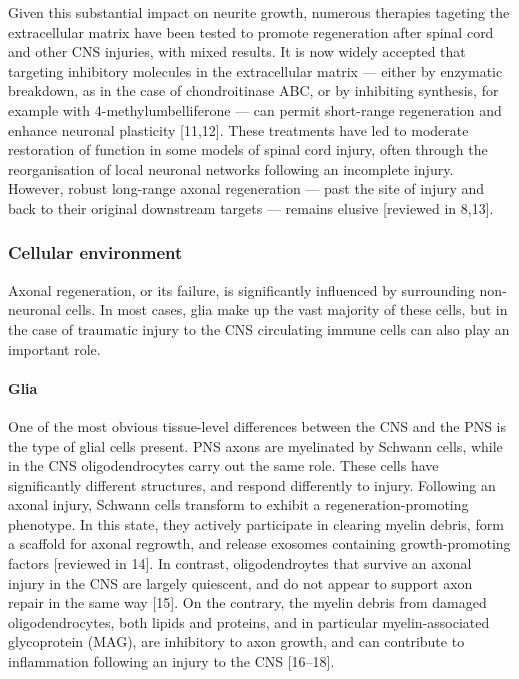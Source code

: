 \documentclass[
  12pt,
  a4paper,
]{book}
\begin{document}
Given this substantial impact on neurite growth, numerous therapies tageting the extracellular matrix have been tested to promote regeneration after spinal cord and other CNS injuries, with mixed results. It is now widely accepted that targeting inhibitory molecules in the extracellular matrix --- either by enzymatic breakdown, as in the case of chondroitinase ABC, or by inhibiting synthesis, for example with 4-methylumbelliferone --- can permit short-range regeneration and enhance neuronal plasticity {[}11,12{]}. These treatments have led to moderate restoration of function in some models of spinal cord injury, often through the reorganisation of local neuronal networks following an incomplete injury. However, robust long-range axonal regeneration --- past the site of injury and back to their original downstream targets --- remains elusive {[}reviewed in 8,13{]}.

\hypertarget{cellular-environment}{%
\subsubsection{Cellular environment}\label{cellular-environment}}

Axonal regeneration, or its failure, is significantly influenced by surrounding non-neuronal cells. In most cases, glia make up the vast majority of these cells, but in the case of traumatic injury to the CNS circulating immune cells can also play an important role.

\hypertarget{glia}{%
\paragraph{Glia}\label{glia}}

One of the most obvious tissue-level differences between the CNS and the PNS is the type of glial cells present. PNS axons are myelinated by Schwann cells, while in the CNS oligodendrocytes carry out the same role. These cells have significantly different structures, and respond differently to injury. Following an axonal injury, Schwann cells transform to exhibit a regeneration-promoting phenotype. In this state, they actively participate in clearing myelin debris, form a scaffold for axonal regrowth, and release exosomes containing growth-promoting factors {[}reviewed in 14{]}. In contrast, oligodendroytes that survive an axonal injury in the CNS are largely quiescent, and do not appear to support axon repair in the same way {[}15{]}. On the contrary, the myelin debris from damaged oligodendrocytes, both lipids and proteins, and in particular myelin-associated glycoprotein (MAG), are inhibitory to axon growth, and can contribute to inflammation following an injury to the CNS {[}16--18{]}.
\end{document}
